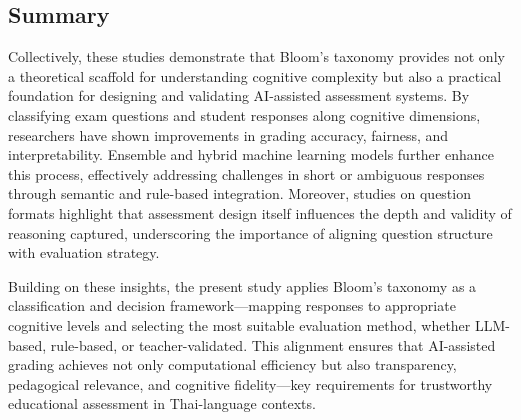 
\subsection{Summary}

Collectively, these studies demonstrate that Bloom’s taxonomy 
provides not only a theoretical scaffold for understanding 
cognitive complexity but also a practical foundation for 
designing and validating AI-assisted assessment systems. By 
classifying exam questions and student responses along 
cognitive dimensions, researchers have shown improvements in 
grading accuracy, fairness, and interpretability. Ensemble and 
hybrid machine learning models further enhance this process, 
effectively addressing challenges in short or ambiguous responses 
through semantic and rule-based integration. Moreover, studies 
on question formats highlight that assessment design itself 
influences the depth and validity of reasoning captured, 
underscoring the importance of aligning question structure 
with evaluation strategy.

Building on these insights, the present study applies Bloom’s 
taxonomy as a classification and decision framework—mapping 
responses to appropriate cognitive levels and selecting the 
most suitable evaluation method, whether LLM-based, rule-based, 
or teacher-validated. This alignment ensures that AI-assisted 
grading achieves not only computational efficiency but also 
transparency, pedagogical relevance, and cognitive fidelity—key 
requirements for trustworthy educational assessment in Thai-language 
contexts.





